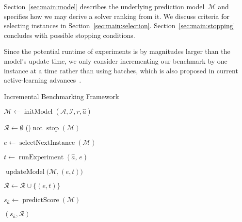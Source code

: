\documentclass[runningheads]{llncs}
\begin{document}
Section~\ref{sec:main:model} describes the underlying prediction model~$\mathcal{M}$ and specifies how we may derive a solver ranking from it.
We discuss criteria for selecting instances in Section~\ref{sec:main:selection}.
Section~\ref{sec:main:stopping} concludes with possible stopping conditions.

Since the potential runtime of experiments is by magnitudes larger than the model's update time, we only consider incrementing our benchmark by one instance at a time rather than using batches, which is also proposed in current active-learning advances~\cite{SinhaED19,2019gaal}.

\begin{algorithm}
  \caption{Incremental Benchmarking Framework}
  \label{algALBenchmark}


  \BlankLine

  $\mathcal{M} \leftarrow \operatorname{initModel}(\mathcal{A}, \mathcal{I}, r, \hat{a})$ 
  
  \BlankLine
  $\mathcal{R} \leftarrow \emptyset$ \;
  \While(){$\operatorname{not} \operatorname{stop}(\mathcal{M})$}{
    $e \leftarrow \operatorname{selectNextInstance}\!\left(\mathcal{M}\right)$ 

    $t \leftarrow \operatorname{runExperiment}\!\left(\hat{a},\,  e\right)$  

    $\operatorname{updateModel}\bigr(\mathcal{M}, (e, t)\bigl)$ 
    
    \BlankLine
    $\mathcal{R} \leftarrow \mathcal{R} \cup \bigl\{ (e, t) \bigr\}$
  }
  $s_{\hat a} \leftarrow \operatorname{predictScore}(\mathcal{M})$ 
  
  \BlankLine
  \Return $(s_{\hat a}, \mathcal{R})$

\end{algorithm}
\end{document}
